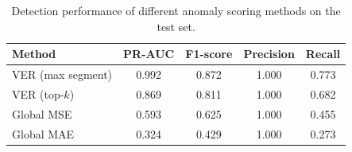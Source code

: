 \begin{table}[H]
\centering
\caption{Detection performance of different anomaly scoring methods on the test set.}
\begin{tabular}{lcccc}
\hline
Method & PR-AUC & F1-score & Precision & Recall \\
\hline
VER (max segment) & 0.992 & 0.872 & 1.000 & 0.773 \\
VER (top-$k$) & 0.869 & 0.811 & 1.000 & 0.682 \\
Global MSE & 0.593 & 0.625 & 1.000 & 0.455 \\
Global MAE & 0.324 & 0.429 & 1.000 & 0.273 \\
\hline
\end{tabular}
\label{tab:detection_performance}
\end{table}